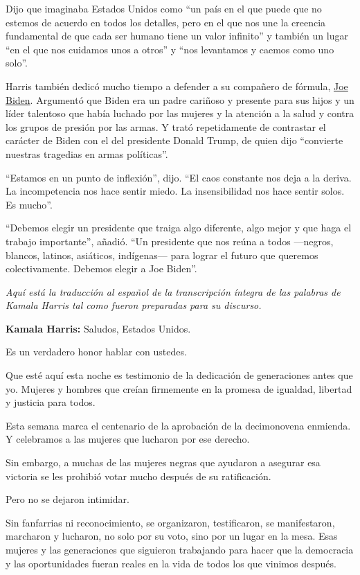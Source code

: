 Dijo que imaginaba Estados Unidos como ``un país en el que puede que no
estemos de acuerdo en todos los detalles, pero en el que nos une la
creencia fundamental de que cada ser humano tiene un valor infinito'' y
también un lugar ``en el que nos cuidamos unos a otros'' y ``nos
levantamos y caemos como uno solo''.

Harris también dedicó mucho tiempo a defender a su compañero de fórmula,
\href{https://www.nytimes3xbfgragh.onion/es/interactive/2020/espanol/estados-unidos/joe-biden-elecciones.html}{Joe
Biden}. Argumentó que Biden era un padre cariñoso y presente para sus
hijos y un líder talentoso que había luchado por las mujeres y la
atención a la salud y contra los grupos de presión por las armas. Y
trató repetidamente de contrastar el carácter de Biden con el del
presidente Donald Trump, de quien dijo ``convierte nuestras tragedias en
armas políticas''.

``Estamos en un punto de inflexión'', dijo. ``El caos constante nos deja
a la deriva. La incompetencia nos hace sentir miedo. La insensibilidad
nos hace sentir solos. Es mucho''.

``Debemos elegir un presidente que traiga algo diferente, algo mejor y
que haga el trabajo importante'', añadió. ``Un presidente que nos reúna
a todos ---negros, blancos, latinos, asiáticos, indígenas--- para lograr
el futuro que queremos colectivamente. Debemos elegir a Joe Biden''.

\emph{Aquí está la traducción al español de la transcripción íntegra de
las palabras de Kamala Harris tal como fueron preparadas para su
discurso.}

\textbf{Kamala Harris:} Saludos, Estados Unidos.

Es un verdadero honor hablar con ustedes.

Que esté aquí esta noche es testimonio de la dedicación de generaciones
antes que yo. Mujeres y hombres que creían firmemente en la promesa de
igualdad, libertad y justicia para todos.

Esta semana marca el centenario de la aprobación de la decimonovena
enmienda. Y celebramos a las mujeres que lucharon por ese derecho.

Sin embargo, a muchas de las mujeres negras que ayudaron a asegurar esa
victoria se les prohibió votar mucho después de su ratificación.

Pero no se dejaron intimidar.

Sin fanfarrias ni reconocimiento, se organizaron, testificaron, se
manifestaron, marcharon y lucharon, no solo por su voto, sino por un
lugar en la mesa. Esas mujeres y las generaciones que siguieron
trabajando para hacer que la democracia y las oportunidades fueran
reales en la vida de todos los que vinimos después.

